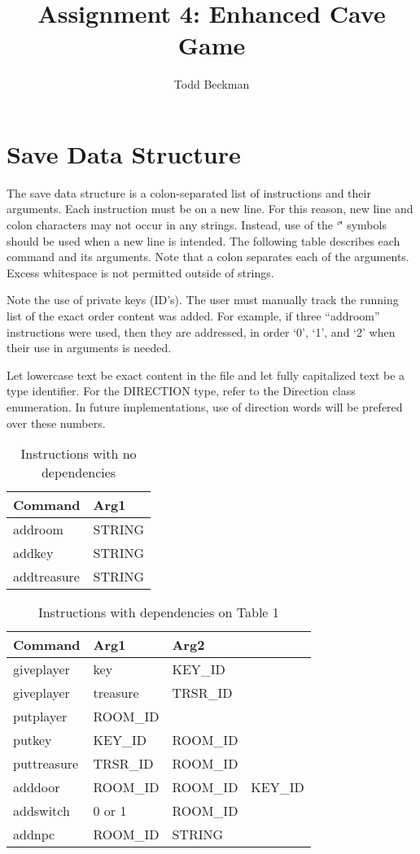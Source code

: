 \documentclass{article}
\begin{document}
\title{Assignment 4: Enhanced Cave Game}
\author{Todd Beckman}
\date{}
\maketitle

\section*{Save Data Structure}

The save data structure is a colon-separated list of instructions and
their arguments. Each instruction must be on a new line. For this reason,
new line and colon characters may not occur in any strings. Instead, use of 
the `\~' symbols should be used when a new line is intended. The following 
table describes each command and its arguments. Note that a colon separates
each of the arguments. Excess whitespace is not permitted outside of strings.

Note the use of private keys (ID's). The user must manually track the running
list of the exact order content was added. For example, if three ``addroom''
instructions were used, then they are addressed, in order `0', `1', and `2'
when their use in arguments is needed.

Let lowercase text be exact content in the file and let fully capitalized text
be a type identifier. For the DIRECTION type, refer to the Direction class
enumeration. In future implementations, use of direction words will be prefered
over these numbers.

\begin{table}[H]
\caption{Instructions with no dependencies}
\begin{tabular}{ | l | l | }
\hline
Command     & Arg1    \\ \hline
addroom     & STRING  \\ \hline
addkey      & STRING  \\ \hline
addtreasure & STRING  \\ \hline
\end{tabular}
\end{table}

\begin{table}[H]
\caption{Instructions with dependencies on Table 1}
\begin{tabular}{ | l | l | l | l | }
\hline
Command     & Arg1     & Arg2     &       \\ \hline
giveplayer  & key      & KEY\_ID  &       \\ \hline
giveplayer  & treasure & TRSR\_ID &       \\ \hline
putplayer   & ROOM\_ID &          &       \\ \hline
putkey      & KEY\_ID  & ROOM\_ID &       \\ \hline
puttreasure & TRSR\_ID & ROOM\_ID &       \\ \hline
adddoor     & ROOM\_ID & ROOM\_ID & KEY\_ID\\ \hline
addswitch   & 0 or 1   & ROOM\_ID &       \\ \hline
addnpc      & ROOM\_ID & STRING   &       \\ \hline
\end{tabular}
\end{table}
\end{document}
